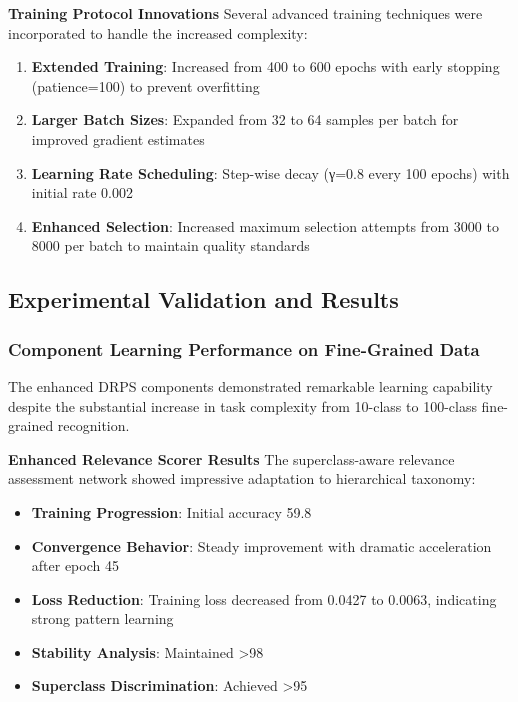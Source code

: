 \documentclass[12pt]{article}
\begin{document}
\textbf{Training Protocol Innovations}
Several advanced training techniques were incorporated to handle the increased complexity:

\begin{enumerate}
\item \textbf{Extended Training}: Increased from 400 to 600 epochs with early stopping (patience=100) to prevent overfitting
\item \textbf{Larger Batch Sizes}: Expanded from 32 to 64 samples per batch for improved gradient estimates
\item \textbf{Learning Rate Scheduling}: Step-wise decay (γ=0.8 every 100 epochs) with initial rate 0.002
\item \textbf{Enhanced Selection}: Increased maximum selection attempts from 3000 to 8000 per batch to maintain quality standards
\end{enumerate}

\subsection{Experimental Validation and Results}\label{results}

\subsubsection{Component Learning Performance on Fine-Grained Data}\label{component-performance}

The enhanced DRPS components demonstrated remarkable learning capability despite the substantial increase in task complexity from 10-class to 100-class fine-grained recognition.

\textbf{Enhanced Relevance Scorer Results}
The superclass-aware relevance assessment network showed impressive adaptation to hierarchical taxonomy:

\begin{itemize}
\item \textbf{Training Progression}: Initial accuracy 59.8%
\item \textbf{Convergence Behavior}: Steady improvement with dramatic acceleration after epoch 45
\item \textbf{Loss Reduction}: Training loss decreased from 0.0427 to 0.0063, indicating strong pattern learning
\item \textbf{Stability Analysis}: Maintained >98%
\item \textbf{Superclass Discrimination}: Achieved >95%
\end{itemize}
\end{document}

